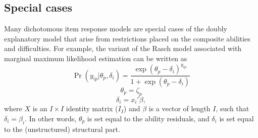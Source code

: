\documentclass[12pt, letterpaper]{article}
\begin{document}

%


\subsection{Special cases}
\label{sec:special-cases}

Many dichotomous item response models are special cases of the doubly explanatory model that arise from restrictions placed on the composite abilities and difficulties. For example, the variant of the Rasch model \parencite{Rasch1960a} associated with marginal maximum likelihood estimation \parencite{bock1981marginal} can be written as
\begin{equation}
	\Pr ( y_{ip} | \theta_p, \delta_i) =
	\frac {\exp(\theta_p - \delta_i)^{y_{ip}}}
	{1 + \exp(\theta_p - \delta_i)}
\end{equation}
\begin{equation}
	\theta_p = \zeta_p
\end{equation}
\begin{equation}
	\delta_i = x_i' \beta
,\end{equation}
where $X$ is an $I \times I$ identity matrix ($I_I$) and $\beta$ is a vector of length $I$, such that $\delta_i = \beta_i$. In other words, $\theta_p$ is set equal to the ability residuals, and $\delta_i$ is set equal to the (unstructured) structural part.
\end{document}
